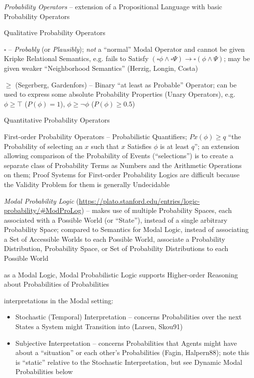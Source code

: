 \emph{Probability Operators} -- extension of a Propositional Language with basic
Probability Operators

Qualitative Probability Operators

$\square$ -- \emph{Probably} (or \emph{Plausibly}); \emph{not} a ``normal''
Modal Operator and cannot be given Kripke Relational Semantics, e.g. fails to
Satisfy $(\square\phi \wedge \square\Psi) \rightarrow \square(\phi \wedge
\Psi)$; may be given weaker ``Neighborhood Semantics'' (Herzig, Longin, Costa)

$\geq$ (Segerberg, Gardenfors) -- Binary ``at least as Probable'' Operator; can
be used to express some absolute Probability Properties (Unary Operators), e.g.
$\phi\geq\top$ ($P(\phi) = 1$), $\phi \geq \neg\phi$ ($P(\phi) \geq 0.5$)

Quantitative Probability Operators

First-order Probability Operators -- Probabilistic Quantifiers;
$Px(\phi) \geq q$ ``the Probability of selecting an $x$ such that $x$ Satisfies
$\phi$ is at least $q$''; an extension allowing comparison of the Probability of
Events (``selections'') is to create a separate class of Probability Terms as
Numbers and the Arithmetic Operations on them; Proof Systems for First-order
Probability Logics are difficult because the Validity Problem for them is
generally Undecidable


\emph{Modal Probability Logic}
(\url{https://plato.stanford.edu/entries/logic-probability/#ModProLog})
-- makes use of multiple Probability Spaces, each associated with a Possible
World (or ``State''), instead of a single arbitrary Probability Space; compared
to Semantics for Modal Logic, instead of associating a Set of Accessible Worlds
to each Possible World, associate a Probability Distribution, Probability Space,
or Set of Probability Distributions to each Possible World

as a Modal Logic, Modal Probabilistic Logic supports Higher-order Reasoning
about Probabilities of Probabilities

interpretations in the Modal setting:
\begin{itemize}
  \item Stochastic (Temporal) Interpretation -- concerns Probabilities over the
    next States a System might Transition into (Larsen, Skou91)
  \item Subjective Interpretation -- concerns Probabilities that Agents might
    have about a ``situation'' or each other's Probabilities (Fagin, Halpern88);
    note this is ``static'' relative to the Stochastic Interpretation, but see
    Dynamic Modal Probabilities below
\end{itemize}

